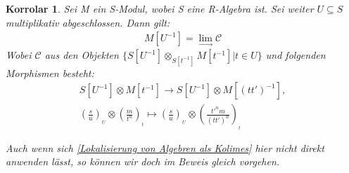 \documentclass[10pt,a4paper]{report}
\newcommand{\comment}[1]{}
\newcounter{Aussage}[chapter]
\newtheorem{korrolar}[Aussage]{Korrolar}
\newcommand{\Tensor}[3]{#1 \otimes_{#2} #3}
\newcommand{\tensor}[3]{#1 \otimes #3}
\newcommand{\lok}[2]{#1 [#2^{-1}]}
\newcommand{\loke}[3]{(\frac{#1}{#2})_{_{#3}}}
\newcommand{\colimes}[0]{\lim\limits_{ \longrightarrow }}
\begin{document}
\begin{korrolar}\comment{\label{Lokalisierung von Moduln als Kolimes}}
Sei M ein S-Modul, wobei S eine R-Algebra ist. Sei weiter $U \subseteq S$ multiplikativ abgeschlossen. Dann gilt:
\begin{gather*}
\lok{M}{U} = \colimes \mathcal{C}
\end{gather*}
Wobei $\mathcal{C}$ aus den Objekten $\lbrace \Tensor{\lok{S}{U}}{\lok{S}{t}}{\lok{M}{t}} \vert t \in U \rbrace$ und folgenden Morphismen besteht:
\begin{gather*}
\tensor{\lok{S}{U}}{\lok{S}{t}}{\lok{M}{t}} \longrightarrow
\tensor{\lok{S}{U}}{\lok{S}{(tt')}}{\lok{M}{(tt')}} ,\\
\tensor{\loke{s}{u}{U}}{\lok{S}{t}}{\loke{m}{t^n}{t}} \longmapsto
\tensor{\loke{s}{u}{U}}{\lok{S}{t}}{\loke{t'^nm}{(tt')^n}{t}} 
\end{gather*}
\end{korrolar}
\textit{Auch wenn sich \cref{Lokalisierung von Algebren als Kolimes} hier nicht direkt anwenden lässt, so können wir doch im Beweis gleich vorgehen.}
\end{document}
